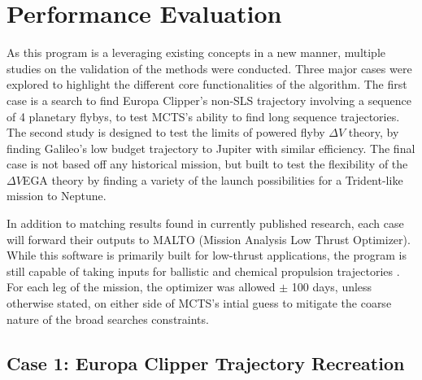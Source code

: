 \documentclass[letterpaper, preprint, paper,11pt]{AAS}	%
\begin{document}
\section{Performance Evaluation}

As this program is a leveraging existing concepts in a new manner, multiple studies on the validation of the methods were conducted. Three major cases were explored to highlight the different core functionalities of the algorithm. The first case is a search to find Europa Clipper's non-SLS trajectory involving a sequence of 4 planetary flybys, to test MCTS's ability to find long sequence trajectories. The second study is designed to test the limits of powered flyby $\Delta V$ theory, by finding Galileo's low budget trajectory to Jupiter with similar efficiency. The final case is not based off any historical mission, but built to test the flexibility of the $\Delta V$EGA theory by finding a variety of the launch possibilities for a Trident-like mission to Neptune.

In addition to matching results found in currently published research, each case will forward their outputs to MALTO (Mission Analysis Low Thrust Optimizer). While this software is primarily built for low-thrust applications, the program is still capable of taking inputs for ballistic and chemical propulsion trajectories \cite{Sims2006}. For each leg of the mission, the optimizer was allowed $\pm$ 100 days, unless otherwise stated, on either side of MCTS's intial guess to mitigate the coarse nature of the broad searches constraints. 

\subsection{Case 1: Europa Clipper Trajectory Recreation}
\end{document}
